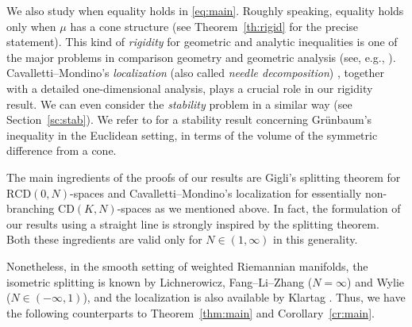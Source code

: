 \documentclass[sts]{imsart}
\theoremstyle{definition}
\theoremstyle{remark}
\newcommand{\CD}{\mathrm{CD}}
\newcommand{\RCD}{\mathrm{RCD}}
\newcommand{\Ric}{\mathrm{Ric}}
\newcommand{\veb}[1]{\textcolor{blue}{\textbf{VEB:}  #1}}
\begin{document}
We also study when equality holds in \eqref{eq:main}.
Roughly speaking, equality holds only when $\mu$ has a cone structure (see Theorem~\ref{th:rigid} for the precise statement).
This kind of \emph{rigidity} for geometric and analytic inequalities is one of the major problems in comparison geometry and geometric analysis (see, e.g., \cite{GKKO,OT}).
Cavalletti--Mondino's \emph{localization} (also called \emph{needle decomposition}) \cite{CM}, together with a detailed one-dimensional analysis, plays a crucial role in our rigidity result.
We can even consider the \emph{stability} problem in a similar way
(see Section~\ref{sc:stab}).
We refer to \cite{Gr00} for a stability result concerning Gr\"unbaum's inequality in the Euclidean setting, in terms of the volume of the symmetric difference from a cone.

The main ingredients of the proofs of our results are
Gigli's splitting theorem for $\RCD(0,N)$-spaces and Cavalletti--Mondino's localization for essentially non-branching $\CD(K,N)$-spaces as we mentioned above.
In fact, the formulation of our results using a straight line is strongly inspired by the splitting theorem.
Both these ingredients are valid only for $N \in (1,\infty)$ in this generality.

Nonetheless, in the smooth setting of weighted Riemannian manifolds, the isometric splitting is known by Lichnerowicz, Fang--Li--Zhang \cite{Li,FLZ} ($N=\infty$) and Wylie \cite{Wy} ($N \in (-\infty,1)$),
and the localization is also available by Klartag \cite{Kl}.
Thus, we have the following counterparts to Theorem~\ref{thm:main} and Corollary~\ref{cr:main}.

\end{document}
